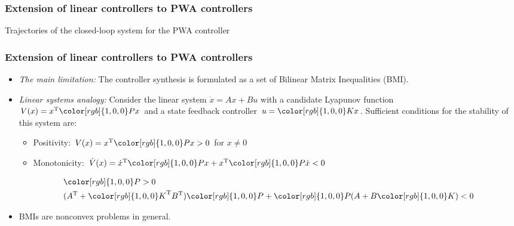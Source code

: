 \documentclass{beamer}
\newcommand{\red}{\color[rgb]{1,0,0}}
\newcommand{\TR}{\text{T}}
\begin{document}
  \frame
  {
    \frametitle{Extension of linear controllers to PWA controllers}
\centerline{}
\centerline{Trajectories of the closed-loop system for the PWA controller}
}
  
  \frame
  {
    \frametitle{Extension of linear controllers to PWA controllers}
    \begin{itemize}
    \item \emph{The main limitation:} The controller synthesis is formulated as a set of Bilinear Matrix Inequalities (BMI). 
    \item \emph{Linear systems analogy:} Consider the linear system $\dot x = Ax+Bu$ with a candidate Lyapunov function $V(x)=x^\TR {\red P}x$ and a state feedback controller $u={\red K}x$. Sufficient conditions for the stability of this system are: 
    \begin{itemize}
    \item Positivity: $V(x)=x^\TR{\red P}x>0$ for $x\neq 0$ 
    \item Monotonicity: $\dot V(x)=\dot x^\TR{\red P}x+ x^\TR{\red P}\dot x<0$
    \end{itemize}
    \begin{align}
    &{\red P}>0\nonumber\\
    &(A^\TR+{\red K}^\TR B^\TR) {\red P}+{\red P}(A+B{\red K})<0\nonumber
    \end{align}
    \item BMIs are nonconvex problems in general.
    \end{itemize}
}
\end{document}
